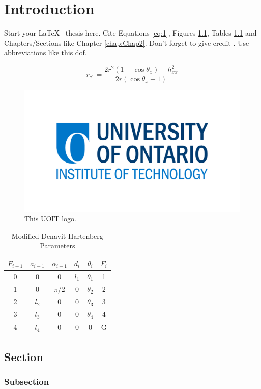 \chapter{Introduction}
\label{chap:Intro}

  Start your \LaTeX ~ thesis here. Cite Equations \eqref{eq:1}, Figures \ref{fig:uoit}, Tables \ref{tab:dh} and Chapters/Sections like Chapter \ref{chap:Chap2}.
  Don't forget to give credit \cite{oldThesis}.
  Use abbreviations like this \gls{dof}.

  \begin{equation}
    \label{eq:1}
    r_{c1} = \frac{2r^2(1-\cos\theta_x)-h^2_{xx}}{2r(\cos\theta_x-1)}
  \end{equation}

  \begin{figure}
    \centering
    \includegraphics{figUOIT}
    \caption{This UOIT logo.}
  \label{fig:uoit}
  \end{figure}

  \begin{table}[h]
  \centering
  \caption{Modified Denavit-Hartenberg Parameters}
    \begin{tabular}{cccccc}
      \toprule
      $F_{i-1}$ & $a_{i-1}$ & $\alpha_{i-1}$ & $d_i$ & $\theta_i$ & $F_i$ \\
      \midrule
      0 & 0 & 0 & $l_1$ & $\theta_1$ & 1 \\
      1 & 0 & $\pi/2$ & 0 & $\theta_2$ & 2 \\
      2 & $l_2$ & 0 & 0 & $\theta_3$ & 3 \\
      3 & $l_3$ & 0 & 0 & $\theta_4$ & 4 \\
      4 & $l_4$ & 0 & 0 & 0 & G \\
      \bottomrule
    \end{tabular}
  \label{tab:dh}
  \end{table}

  \section{Section}
  \label{sec:Section}

    \subsection{Subsection}
    \label{sec:subsection}


